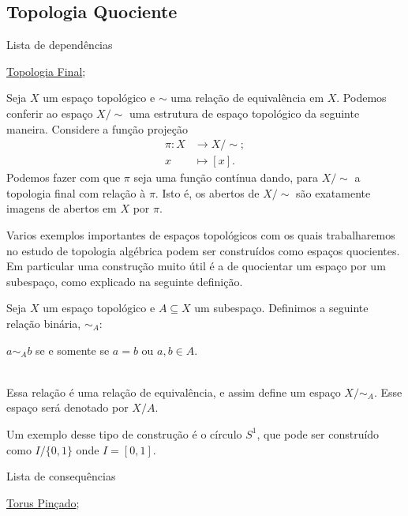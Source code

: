 \subsection{Topologia Quociente}
\label{topologia-quociente-def}
\begin{titlemize}{Lista de dependências}
	\item \hyperref[topologia-final]{Topologia Final}; 
\end{titlemize}
\begin{defi}
	Seja \(X\) um espaço topológico e \(\sim\) uma relação de equivalência em \(X\).
	Podemos conferir ao espaço \(X/\sim\) uma estrutura de espaço topológico da seguinte maneira. Considere a função projeção
	\begin{align*}
		\pi:X&\to X/\sim;\\
		x&\mapsto [x].
	\end{align*}
	Podemos fazer com que \(\pi\) seja uma função contínua dando, para \(X/\sim\) a topologia final com relação à \(\pi\). Isto é, os abertos de \(X/\sim\) são exatamente imagens de abertos em \(X\) por \(\pi\).  
\end{defi}
Varios exemplos importantes de espaços topológicos com os quais trabalharemos no estudo de topologia algébrica podem ser construídos como espaços quocientes. Em particular uma construção muito útil é a de quocientar um espaço por um subespaço, como explicado na seguinte definição.
\begin{defi}
	Seja \(X\) um espaço topológico e \(A \subseteq X\) um subespaço. Definimos a seguinte relação binária, \(\sim_A\):\\
    \centerline{
	\(a\sim_A b\) se e somente se \(a=b\) ou \(a,b\in A\).}\\ Essa relação é uma relação de equivalência, e assim define um espaço \(X/\sim_A\). Esse espaço será denotado por \(X/A\). 
\end{defi}
Um exemplo desse tipo de construção é o círculo \(S^1\), que pode ser construído como \(I/\{0,1\}\) onde \(I=[0,1]\). 
\begin{titlemize}{Lista de consequências}
	\item \hyperref[pinched-torus-ex]{Torus Pinçado};
\end{titlemize}


